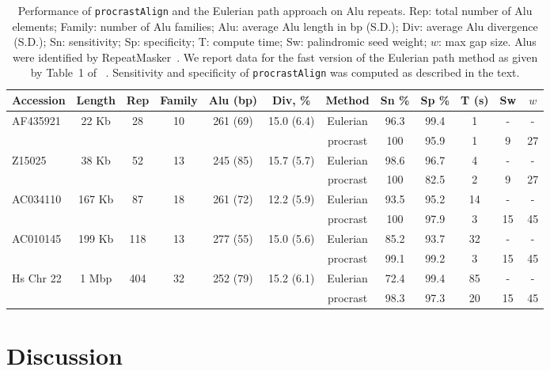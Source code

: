 \documentclass{llncs}
\begin{document}
\begin{table}[t]
  \centering
\begin{tabular}{lccccccccccc}
\hline Accession & Length & Rep & Family & Alu (bp) & Div, \% & Method & Sn \% & Sp \% & T (s) & Sw & $w$ \\
\hline
\hline AF435921 &  22 Kb &  28 & 10 & 261 (69) & 15.0 (6.4) & Eulerian & 96.3 & 99.4 & 1 & - & - \\
\cline{7-12}                                            &&&&&& procrast & 100 & 95.9 & 1 & 9 & 27 \\
\hline Z15025 &    38 Kb &  52 & 13 & 245 (85) & 15.7 (5.7) & Eulerian & 98.6 & 96.7 & 4 & - & -  \\
\cline{7-12}                                            &&&&&& procrast & 100 & 82.5 & 2 & 9 & 27 \\
\hline AC034110 & 167 Kb &  87 & 18 & 261 (72) & 12.2 (5.9) & Eulerian & 93.5 & 95.2 & 14 & - & - \\
\cline{7-12}                                            &&&&&& procrast & 100 & 97.9 & 3 & 15 & 45 \\
\hline AC010145 & 199 Kb & 118 & 13 & 277 (55) & 15.0 (5.6) & Eulerian & 85.2 & 93.7 & 32 & - & - \\
\cline{7-12}                                            &&&&&& procrast & 99.1 & 99.2 & 3 & 15 & 45 \\
\hline Hs Chr 22 & 1 Mbp & 404 & 32 & 252 (79) & 15.2 (6.1) & Eulerian & 72.4 & 99.4 & 85 & - & - \\
\cline{7-12}                                            &&&&&& procrast & 98.3 & 97.3 & 20 & 15 & 45 \\
\end{tabular}
\vspace{0.1cm}
  \caption{Performance of \texttt{procrastAlign} and the Eulerian path approach on Alu repeats.
  Rep: total number of Alu elements; Family: number of Alu
  families; Alu: average Alu length in bp (S.D.); Div: average Alu divergence (S.D.);
   Sn: sensitivity; Sp: specificity; T: compute time; Sw: palindromic seed weight; $w$: max gap size.  Alus were
  identified by RepeatMasker~\cite{ref-repbase}. We report data for the fast
  version of the Eulerian path method as given by Table~1 of ~\cite{ref-related1}. Sensitivity and specificity
  of \texttt{procrastAlign} was computed as described in the text.}
  \label{table:alu}
\end{table}

\section{ Discussion }
\end{document}
